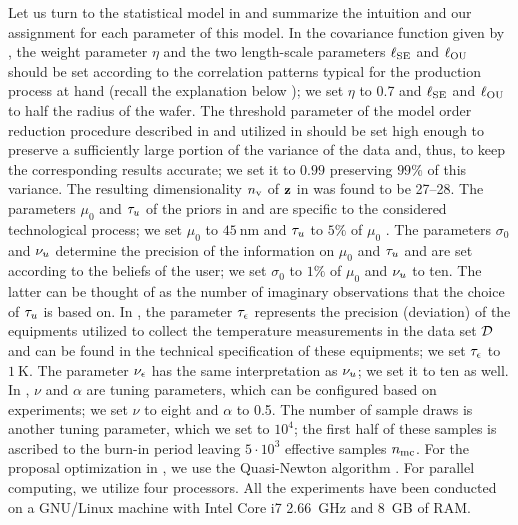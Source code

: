 Let us turn to the statistical model in  and summarize the intuition and our assignment for each parameter of this model.
In the covariance function given by , the weight parameter $\eta$ and the two length-scale parameters $\ell_{\text{SE}}$ and $\ell_{\text{OU}}$ should be set according to the correlation patterns typical for the production process at hand \cite{chandrakasan2001, cheng2011} (recall the explanation below ); we set $\eta$ to 0.7 and $\ell_{\text{SE}}$ and $\ell_{\text{OU}}$ to half the radius of the wafer.
The threshold parameter of the model order reduction procedure described in  and utilized in  should be set high enough to preserve a sufficiently large portion of the variance of the data and, thus, to keep the corresponding results accurate; we set it to $0.99$ preserving $99\%$ of this variance. The resulting dimensionality ${n_\text{v}}$ of $\mathbf{z}$ in  was found to be 27--28.
The parameters $\mu_0$ and $\tau_u$ of the priors in  and  are specific to the considered technological process; we set $\mu_0$ to $45~\text{nm}$ and $\tau_u$ to $5\%$ of $\mu_0$ \cite{juan2011, juan2012}.
The parameters $\sigma_0$ and $\nu_u$ determine the precision of the information on $\mu_0$ and $\tau_u$ and are set according to the beliefs of the user; we set $\sigma_0$ to $1\%$ of $\mu_0$ and $\nu_u$ to ten.
The latter can be thought of as the number of imaginary observations that the choice of $\tau_u$ is based on.
In , the parameter $\tau_\epsilon$ represents the precision (deviation) of the equipments utilized to collect the temperature measurements in the data set $\mathcal{D}$ and can be found in the technical specification of these equipments; we set $\tau_\epsilon$ to $1~\text{K}$. The parameter $\nu_\epsilon$ has the same interpretation as $\nu_u$; we set it to ten as well.
In , $\nu$ and $\alpha$ are tuning parameters, which can be configured based on experiments; we set $\nu$ to eight and $\alpha$ to 0.5.
The number of sample draws is another tuning parameter, which we set to $10^4$; the first half of these samples is ascribed to the burn-in period leaving $5 \cdot 10^3$ effective samples ${n_\text{mc}}$.
For the proposal optimization in , we use the Quasi-Newton algorithm \cite{press2007}.
For parallel computing, we utilize four processors. All the experiments have been conducted on a GNU/Linux machine with Intel Core i7 2.66~GHz and 8~GB of RAM.

